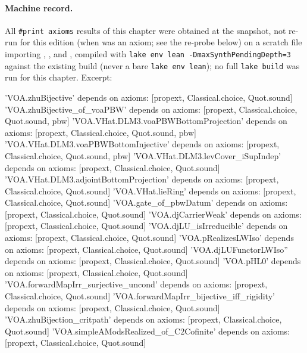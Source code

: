 \paragraph{Machine record.} All \texttt{\#print axioms} results of this chapter were obtained at the snapshot, not re-run for this edition
(when  was an axiom; see the re-probe below) on a scratch file
importing ,
,
 and
, compiled with \texttt{lake env lean -DmaxSynthPendingDepth=3}
against the existing build (never a bare \texttt{lake env lean}); no full \texttt{lake build} was run for this chapter. Excerpt:
\begin{plaincode}
'VOA.zhuBijective' depends on axioms: [propext, Classical.choice, Quot.sound]
'VOA.zhuBijective_of_voaPBW' depends on axioms: [propext, Classical.choice, Quot.sound, pbw]
'VOA.VHat.DLM3.voaPBWBottomProjection' depends on axioms: [propext, Classical.choice, Quot.sound, pbw]
'VOA.VHat.DLM3.voaPBWBottomInjective' depends on axioms: [propext, Classical.choice, Quot.sound, pbw]
'VOA.VHat.DLM3.levCover_iSupIndep' depends on axioms: [propext, Classical.choice, Quot.sound]
'VOA.VHat.DLM3.adjointBottomProjection' depends on axioms: [propext, Classical.choice, Quot.sound]
'VOA.VHat.lieRing' depends on axioms: [propext, Classical.choice, Quot.sound]
'VOA.gate_of_pbwDatum' depends on axioms: [propext, Classical.choice, Quot.sound]
'VOA.djCarrierWeak' depends on axioms: [propext, Classical.choice, Quot.sound]
'VOA.djLU_isIrreducible' depends on axioms: [propext, Classical.choice, Quot.sound]
'VOA.pRealizesLWIso' depends on axioms: [propext, Classical.choice, Quot.sound]
'VOA.djLUFunctorLWIso'' depends on axioms: [propext, Classical.choice, Quot.sound]
'VOA.pHL0' depends on axioms: [propext, Classical.choice, Quot.sound]
'VOA.forwardMapIrr_surjective_uncond' depends on axioms: [propext, Classical.choice, Quot.sound]
'VOA.forwardMapIrr_bijective_iff_rigidity' depends on axioms: [propext, Classical.choice, Quot.sound]
'VOA.zhuBijection_critpath' depends on axioms: [propext, Classical.choice, Quot.sound]
'VOA.simpleAModsRealized_of_C2Cofinite' depends on axioms: [propext, Classical.choice, Quot.sound]
\end{plaincode}
